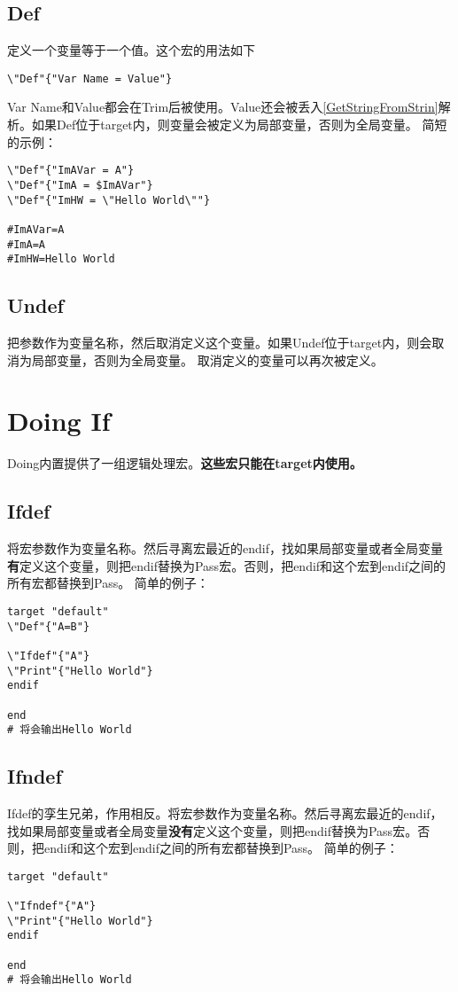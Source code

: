 \subsection{Def}
定义一个变量等于一个值。这个宏的用法如下
\begin{lstlisting}
\"Def"{"Var Name = Value"}
\end{lstlisting}
Var Name和Value都会在Trim后被使用。Value还会被丢入\ref{GetStringFromStrin}解析。如果Def位于target内，则变量会被定义为局部变量，否则为全局变量。
\newline{}
简短的示例：
\begin{lstlisting}
\"Def"{"ImAVar = A"}
\"Def"{"ImA = $ImAVar"}
\"Def"{"ImHW = \"Hello World\""}

#ImAVar=A
#ImA=A
#ImHW=Hello World
\end{lstlisting}

\subsection{Undef}
把参数作为变量名称，然后取消定义这个变量。如果Undef位于target内，则会取消为局部变量，否则为全局变量。
取消定义的变量可以再次被定义。


\section{Doing If}
Doing内置提供了一组逻辑处理宏。\textbf{这些宏只能在target内使用。}

\subsection{Ifdef}
将宏参数作为变量名称。然后寻离宏最近的endif，找如果局部变量或者全局变量\textbf{有}定义这个变量，则把endif替换为Pass宏。否则，把endif和这个宏到endif之间的所有宏都替换到Pass。
\newline{}
简单的例子：
\begin{lstlisting}
target "default"
\"Def"{"A=B"}

\"Ifdef"{"A"}
\"Print"{"Hello World"}
endif

end
# 将会输出Hello World
\end{lstlisting}

\subsection{Ifndef}
Ifdef的孪生兄弟，作用相反。将宏参数作为变量名称。然后寻离宏最近的endif，找如果局部变量或者全局变量\textbf{没有}定义这个变量，则把endif替换为Pass宏。否则，把endif和这个宏到endif之间的所有宏都替换到Pass。
\newline{}
简单的例子：
\begin{lstlisting}
target "default"

\"Ifndef"{"A"}
\"Print"{"Hello World"}
endif

end
# 将会输出Hello World
\end{lstlisting}

